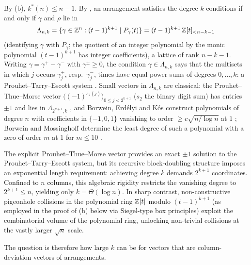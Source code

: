 By (b), $k^*(n)\le n-1$.
By , an arrangement satisfies the degree-$k$ conditions if and only if $\gamma$ and $\rho$ lie in
\[
\Lambda_{n,k}=\{\gamma\in\mathbb{Z}^{n}:(t-1)^{k+1}\mid P_\gamma(t)\}=(t-1)^{k+1}\,\mathbb{Z}[t]_{<n-k-1}
\]
(identifying $\gamma$ with $P_\gamma$; the quotient of an integer polynomial by the monic polynomial $(t-1)^{k+1}$ has integer coefficients), a lattice of rank $n-k-1$.
Writing $\gamma=\gamma^+-\gamma^-$ with $\gamma^\pm\ge0$, the condition $\gamma\in\Lambda_{n,k}$ says that the multisets in which $j$ occurs $\gamma^+_j$, resp.\ $\gamma^-_j$, times have equal power sums of degrees $0,\dots,k$: a Prouhet--Tarry--Escott system \cite{wright1959prouhet,borwein2002computational}.
Small vectors in $\Lambda_{n,k}$ are classical: the Prouhet--Thue--Morse vector $\bigl((-1)^{s_2(j)}\bigr)_{0\le j<2^{k+1}}$ ($s_2$ the binary digit sum) has entries $\pm1$ and lies in $\Lambda_{2^{k+1},k}$ \cite{wright1959prouhet,allouche1999ubiquitous}, and Borwein, Erd\'elyi and K\'os construct polynomials of degree $n$ with coefficients in $\{-1,0,1\}$ vanishing to order $\ge c\sqrt{n/\log n}$ at $1$ \cite[Thm.~2.7]{BEK1999}; Borwein and Mossinghoff determine the least degree of such a polynomial with a zero of order $m$ at $1$ for $m\le10$ \cite{borwein2000height}.

\begin{remark}
\label{rem:ptm_scale}
The explicit Prouhet--Thue--Morse vector provides an exact $\pm 1$ solution to the Prouhet--Tarry--Escott system, but its recursive block-doubling structure imposes an exponential length requirement: achieving degree $k$ demands $2^{k+1}$ coordinates. Confined to $n$ columns, this algebraic rigidity restricts the vanishing degree to $2^{k+1}\le n$, yielding only $k=\Theta(\log n)$. In sharp contrast, non-constructive pigeonhole collisions in the polynomial ring $\mathbb{Z}[t]$ modulo $(t-1)^{k+1}$ (as employed in the proof of (b) below via Siegel-type box principles) exploit the combinatorial volume of the polynomial ring, unlocking non-trivial collisions at the vastly larger $\sqrt n$ scale.
\end{remark}

The question is therefore how large $k$ can be for vectors that are column-deviation vectors of arrangements.

